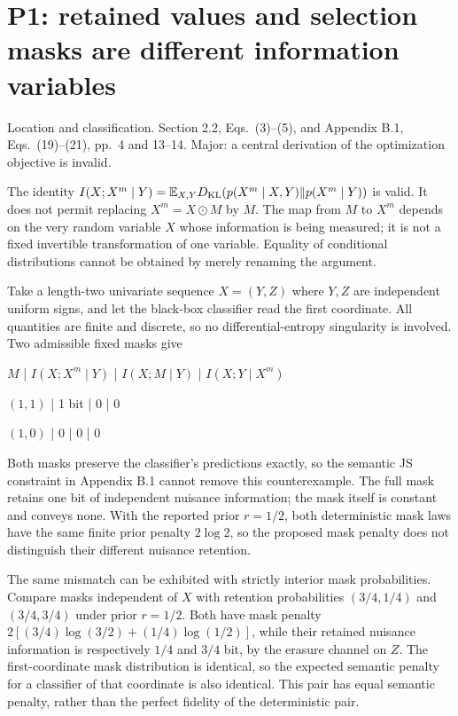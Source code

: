 \documentclass[10pt]{article}
\begin{document}
\section*{P1: retained values and selection masks are different information variables}
Location and classification. Section 2.2, Eqs. (3)–(5), and Appendix B.1, Eqs. (19)–(21), pp. 4 and 13–14. Major: a central derivation of the optimization objective is invalid.\par
The identity \(I(X;X^m\mid Y)=\mathbb E_{X,Y}D_{\rm KL}(p(X^m\mid X,Y)\Vert p(X^m\mid Y))\) is valid. It does not permit replacing \(X^m=X\odot M\) by \(M\). The map from \(M\) to \(X^m\) depends on the very random variable \(X\) whose information is being measured; it is not a fixed invertible transformation of one variable. Equality of conditional distributions cannot be obtained by merely renaming the argument.\par
Take a length-two univariate sequence \(X=(Y,Z)\) where \(Y,Z\) are independent uniform signs, and let the black-box classifier read the first coordinate. All quantities are finite and discrete, so no differential-entropy singularity is involved. Two admissible fixed masks give\par
\(M\) | \(I(X;X^m\mid Y)\) | \(I(X;M\mid Y)\) | \(I(X;Y\mid X^m)\)\par
\((1,1)\) | 1 bit | 0 | 0\par
\((1,0)\) | 0 | 0 | 0\par
Both masks preserve the classifier’s predictions exactly, so the semantic JS constraint in Appendix B.1 cannot remove this counterexample. The full mask retains one bit of independent nuisance information; the mask itself is constant and conveys none. With the reported prior \(r=1/2\), both deterministic mask laws have the same finite prior penalty \(2\log 2\), so the proposed mask penalty does not distinguish their different nuisance retention.\par
The same mismatch can be exhibited with strictly interior mask probabilities. Compare masks independent of \(X\) with retention probabilities \((3/4,1/4)\) and \((3/4,3/4)\) under prior \(r=1/2\). Both have mask penalty \(2[(3/4)\log(3/2)+(1/4)\log(1/2)]\), while their retained nuisance information is respectively \(1/4\) and \(3/4\) bit, by the erasure channel on \(Z\). The first-coordinate mask distribution is identical, so the expected semantic penalty for a classifier of that coordinate is also identical. This pair has equal semantic penalty, rather than the perfect fidelity of the deterministic pair.\par
\end{document}
